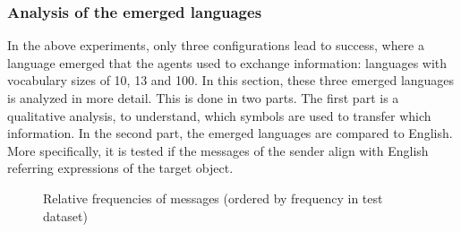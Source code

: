 
\subsubsection*{Analysis of the emerged languages}
In the above experiments, only three configurations lead to success, where a language emerged that the agents used to exchange information: languages with vocabulary sizes of 10, 13 and 100.
In this section, these three emerged languages is analyzed in more detail.
This is done in two parts.
The first part is a qualitative analysis, to understand, which symbols are used to transfer which information.
In the second part, the emerged languages are compared to English.
More specifically, it is tested if the messages of the sender align with English referring expressions of the target object.


\begin{figure}[h]
    \centering
    \caption{Relative frequencies of messages (ordered by frequency in test dataset)}
    \label{fig:relative_frequencies_vocabularies}
\end{figure}

